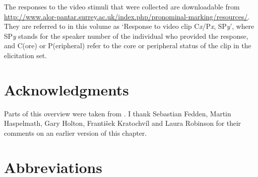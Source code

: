 {The responses to the video stimuli that were collected are downloadable from \url{http://www.alor-pantar.surrey.ac.uk/index.php/pronominal-marking/resources/}. They are referred to in this volume as `Response to video clip C\textit{x}/P\textit{x}, SP\textit{y}', where SP\textit{y} stands for the speaker number of the individual who provided the response, and C(ore) or P(eripheral) refer to the core or peripheral status of the clip in the elicitation set. 

\section*{Acknowledgments}
Parts of this overview were taken from \citet{Klamer2010grammar,Klamer2011,BairdEtAlMs,HoltonEtAlta}. I thank Sebastian Fedden, Martin Haspelmath, Gary Holton, Franti\v{s}ek Kratochv\'il and Laura Robinson for their comments on an earlier version of this chapter.

\section*{Abbreviations}

}
